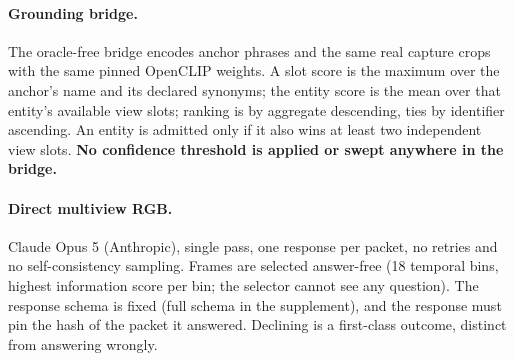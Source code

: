 \paragraph{Grounding bridge.}
The oracle-free bridge encodes anchor phrases and the same real capture crops with the
same pinned OpenCLIP weights. A slot score is the maximum over the anchor's name and its
declared synonyms; the entity score is the mean over that entity's available view slots;
ranking is by aggregate descending, ties by identifier ascending. An entity is admitted
only if it also wins at least two independent view slots. \textbf{No confidence threshold
is applied or swept anywhere in the bridge.}

\paragraph{Direct multiview RGB.}
Claude Opus 5 (Anthropic), single pass, one response per packet, no retries and no
self-consistency sampling. Frames are selected answer-free (18 temporal bins, highest
information score per bin; the selector cannot see any question). The response schema is
fixed (full schema in the supplement), and the response must pin the hash of the
packet it answered.
Declining is a first-class outcome, distinct from answering wrongly.
